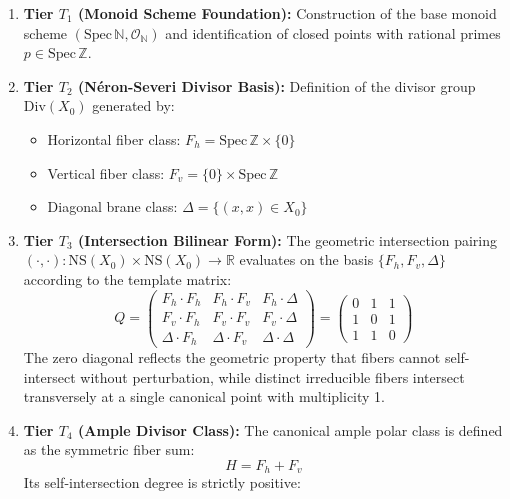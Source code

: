 \documentclass[11pt,a4paper]{article}
\theoremstyle{definition}
\theoremstyle{remark}
\begin{document}
\begin{enumerate}
    \item \textbf{Tier $T_1$ (Monoid Scheme Foundation):} Construction of the base monoid scheme $(\mathrm{Spec}\,\mathbb{N}, \mathcal{O}_{\mathbb{N}})$ and identification of closed points with rational primes $p \in \mathrm{Spec}\,\mathbb{Z}$.
    \item \textbf{Tier $T_2$ (N\'eron-Severi Divisor Basis):} Definition of the divisor group $\mathrm{Div}(X_0)$ generated by:
    \begin{itemize}
        \item Horizontal fiber class: $F_h = \mathrm{Spec}\,\mathbb{Z} \times \{0\}$
        \item Vertical fiber class: $F_v = \{0\} \times \mathrm{Spec}\,\mathbb{Z}$
        \item Diagonal brane class: $\Delta = \{(x, x) \in X_0\}$
    \end{itemize}
    \item \textbf{Tier $T_3$ (Intersection Bilinear Form):} The geometric intersection pairing $(\cdot, \cdot): \mathrm{NS}(X_0) \times \mathrm{NS}(X_0) \to \mathbb{R}$ evaluates on the basis $\{F_h, F_v, \Delta\}$ according to the template matrix:
    \begin{equation}
    Q = \begin{pmatrix}
    F_h \cdot F_h & F_h \cdot F_v & F_h \cdot \Delta \\
    F_v \cdot F_h & F_v \cdot F_v & F_v \cdot \Delta \\
    \Delta \cdot F_h & \Delta \cdot F_v & \Delta \cdot \Delta
    \end{pmatrix} = \begin{pmatrix}
    0 & 1 & 1 \\
    1 & 0 & 1 \\
    1 & 1 & 0
    \end{pmatrix}
    \end{equation}
    The zero diagonal reflects the geometric property that fibers cannot self-intersect without perturbation, while distinct irreducible fibers intersect transversely at a single canonical point with multiplicity 1.
    \item \textbf{Tier $T_4$ (Ample Divisor Class):} The canonical ample polar class is defined as the symmetric fiber sum:
    \begin{equation}
    H = F_h + F_v
    \end{equation}
    Its self-intersection degree is strictly positive:
    \begin{equation}

\end{equation}
\end{enumerate}
\end{document}
